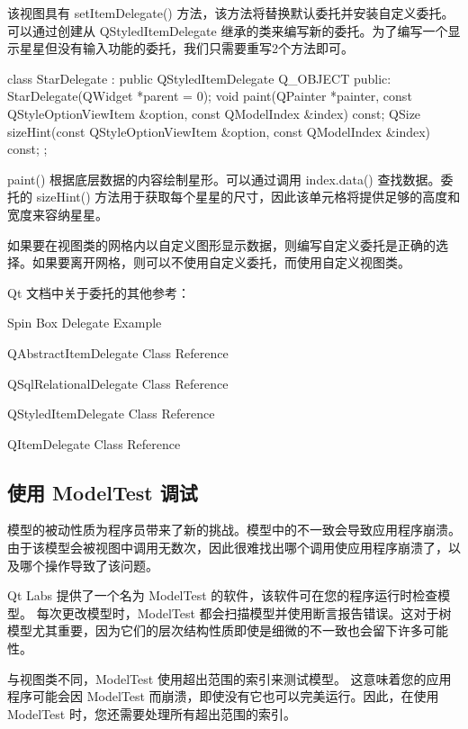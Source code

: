 该视图具有 setItemDelegate() 方法，该方法将替换默认委托并安装自定义委托。
可以通过创建从 QStyledItemDelegate 继承的类来编写新的委托。为了编写一个显示星星但没有输入功能的委托，我们只需要重写2个方法即可。


\begin{cppcode}
class StarDelegate : public QStyledItemDelegate
{
    Q_OBJECT
public:
    StarDelegate(QWidget *parent = 0);
    void paint(QPainter *painter, const QStyleOptionViewItem &option,
               const QModelIndex &index) const;
    QSize sizeHint(const QStyleOptionViewItem &option,
                   const QModelIndex &index) const;
};
\end{cppcode}

paint() 根据底层数据的内容绘制星形。可以通过调用 index.data() 查找数据。委托的 sizeHint() 方法用于获取每个星星的尺寸，因此该单元格将提供足够的高度和宽度来容纳星星。

如果要在视图类的网格内以自定义图形显示数据，则编写自定义委托是正确的选择。如果要离开网格，则可以不使用自定义委托，而使用自定义视图类。

Qt 文档中关于委托的其他参考：

\begin{compactitem}
\item Spin Box Delegate Example
\item QAbstractItemDelegate Class Reference
\item QSqlRelationalDelegate Class Reference
\item QStyledItemDelegate Class Reference
\item QItemDelegate Class Reference
\end{compactitem}

\subsection{使用 ModelTest 调试}

模型的被动性质为程序员带来了新的挑战。模型中的不一致会导致应用程序崩溃。
由于该模型会被视图中调用无数次，因此很难找出哪个调用使应用程序崩溃了，以及哪个操作导致了该问题。

Qt Labs 提供了一个名为 ModelTest 的软件，该软件可在您的程序运行时检查模型。
每次更改模型时，ModelTest 都会扫描模型并使用断言报告错误。这对于树模型尤其重要，因为它们的层次结构性质即使是细微的不一致也会留下许多可能性。

与视图类不同，ModelTest 使用超出范围的索引来测试模型。
这意味着您的应用程序可能会因 ModelTest 而崩溃，即使没有它也可以完美运行。因此，在使用 ModelTest 时，您还需要处理所有超出范围的索引。

